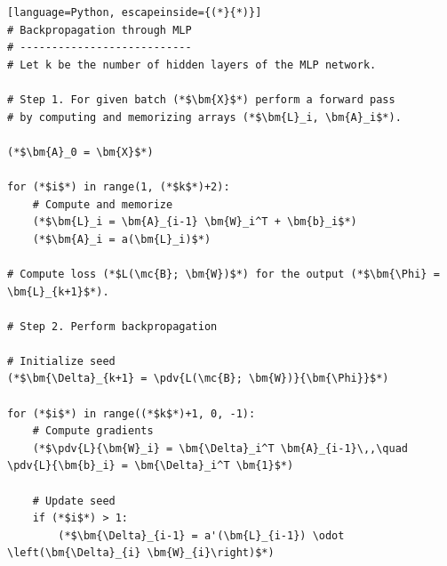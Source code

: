 \documentclass{myclass}
\numberwithin{equation}{subsection}
\begin{document}
\begin{lstlisting}[language=Python, escapeinside={(*}{*)}]
# Backpropagation through MLP
# ---------------------------
# Let k be the number of hidden layers of the MLP network.

# Step 1. For given batch (*$\bm{X}$*) perform a forward pass 
# by computing and memorizing arrays (*$\bm{L}_i, \bm{A}_i$*).

(*$\bm{A}_0 = \bm{X}$*)

for (*$i$*) in range(1, (*$k$*)+2):
    # Compute and memorize
    (*$\bm{L}_i = \bm{A}_{i-1} \bm{W}_i^T + \bm{b}_i$*)
    (*$\bm{A}_i = a(\bm{L}_i)$*)

# Compute loss (*$L(\mc{B}; \bm{W})$*) for the output (*$\bm{\Phi} = \bm{L}_{k+1}$*).

# Step 2. Perform backpropagation

# Initialize seed
(*$\bm{\Delta}_{k+1} = \pdv{L(\mc{B}; \bm{W})}{\bm{\Phi}}$*)

for (*$i$*) in range((*$k$*)+1, 0, -1):
    # Compute gradients
    (*$\pdv{L}{\bm{W}_i} = \bm{\Delta}_i^T \bm{A}_{i-1}\,,\quad \pdv{L}{\bm{b}_i} = \bm{\Delta}_i^T \bm{1}$*)
    
    # Update seed
    if (*$i$*) > 1:
        (*$\bm{\Delta}_{i-1} = a'(\bm{L}_{i-1}) \odot \left(\bm{\Delta}_{i} \bm{W}_{i}\right)$*)

\end{lstlisting}
\end{document}
